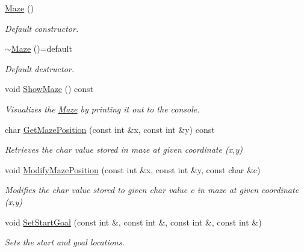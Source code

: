 \begin{DoxyCompactItemize}
\item 
\mbox{\label{class_maze_a7ecf1da4b9685f97bf3110a8479e724b}} 
\mbox{\hyperlink{class_maze_a7ecf1da4b9685f97bf3110a8479e724b}{Maze}} ()
\begin{DoxyCompactList}\small\item\em Default constructor. \end{DoxyCompactList}\item 
\mbox{\label{class_maze_a691dfe062caff0cbd74338b3a5853da4}} 
\mbox{\hyperlink{class_maze_a691dfe062caff0cbd74338b3a5853da4}{$\sim$\+Maze}} ()=default
\begin{DoxyCompactList}\small\item\em Default destructor. \end{DoxyCompactList}\item 
\mbox{\label{class_maze_a5b87d8df77ff49135de2773393ef85a5}} 
void \mbox{\hyperlink{class_maze_a5b87d8df77ff49135de2773393ef85a5}{Show\+Maze}} () const
\begin{DoxyCompactList}\small\item\em Visualizes the \mbox{\hyperlink{class_maze}{Maze}} by printing it out to the console. \end{DoxyCompactList}\item 
char \mbox{\hyperlink{class_maze_a951b00bd297fc74c0543e89a48958d39}{Get\+Maze\+Position}} (const int \&x, const int \&y) const
\begin{DoxyCompactList}\small\item\em Retrieves the char value stored in maze at given coordinate (x,y) \end{DoxyCompactList}\item 
void \mbox{\hyperlink{class_maze_a6f09383c87f09e733eac046c7a183756}{Modify\+Maze\+Position}} (const int \&x, const int \&y, const char \&c)
\begin{DoxyCompactList}\small\item\em Modifies the char value stored to given char value c in maze at given coordinate (x,y) \end{DoxyCompactList}\item 
void \mbox{\hyperlink{class_maze_abc9edd3ac225e6cdb3114d903a2de70c}{Set\+Start\+Goal}} (const int \&, const int \&, const int \&, const int \&)
\begin{DoxyCompactList}\small\item\em Sets the start and goal locations. \end{DoxyCompactList}\item 

\end{DoxyCompactItemize}
